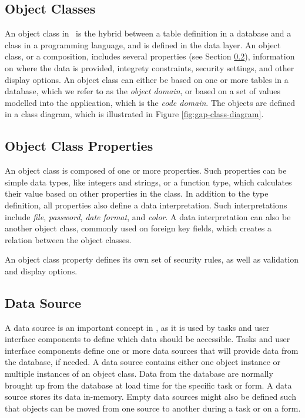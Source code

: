 \subsection{Object Classes}
\label{sub:Object Classes}
An object class in \gap~is the hybrid between a table definition in a database and a class in a programming language, and is defined in the data layer. An object class, or a composition, includes several properties (see Section \ref{sec:Object Class Properties}), information on where the data is provided, integrety constraints, security settings, and other display options. An object class can either be based on one or more tables in a database, which we refer to as the \textit{object domain}, or based on a set of values modelled into the application, which is the \textit{code domain}. The objects are defined in a class diagram, which is illustrated in Figure \ref{fig:gap-class-diagram}.

\subsection{Object Class Properties}
\label{sec:Object Class Properties}
An object class is composed of one or more properties. Such properties can be simple data types, like integers and strings, or a function type, which calculates their value based on other properties in the class. In addition to the type definition, all properties also define a data interpretation. Such interpretations include \textit{file}, \textit{password}, \textit{date format}, and \textit{color}. A data interpretation can also be another object class, commonly used on foreign key fields, which creates a relation between the object classes.

An object class property defines its own set of security rules, as well as validation and display options.

\subsection{Data Source}
\label{sub:Data Source}
A data source is an important concept in \gap, as it is used by tasks and user interface components to define which data should be accessible. Tasks and user interface components define one or more data sources that will provide data from the database, if needed. A data source contains either one object instance or multiple instances of an object class. Data from the database are normally brought up from the database at load time for the specific task or form. A data source stores its data in-memory. Empty data sources might also be defined such that objects can be moved from one source to another during a task or on a form.

